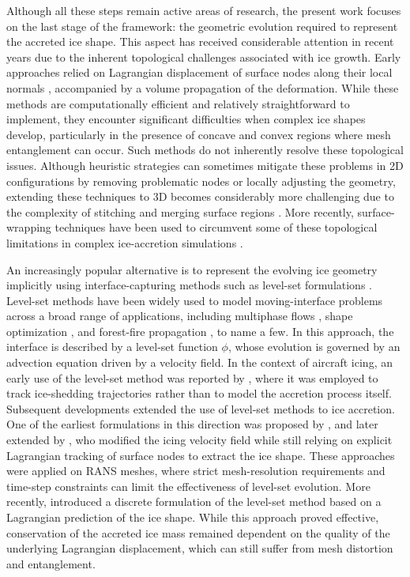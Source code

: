 Although all these steps remain active areas of research, the present work focuses on the last stage of the framework: the geometric evolution required to represent the accreted ice shape. This aspect has received considerable attention in recent years due to the inherent topological challenges associated with ice growth. Early approaches relied on Lagrangian displacement of surface nodes along their local normals \cite{thompsonDeformation}, accompanied by a volume propagation of the deformation. While these methods are computationally efficient and relatively straightforward to implement, they encounter significant difficulties when complex ice shapes develop, particularly in the presence of concave and convex regions where mesh entanglement can occur. Such methods do not inherently resolve these topological issues. Although heuristic strategies can sometimes mitigate these problems in 2D configurations by removing problematic nodes or locally adjusting the geometry, extending these techniques to 3D becomes considerably more challenging due to the complexity of stitching and merging surface regions \cite{glimm2000}.  More recently, surface-wrapping techniques have been used to circumvent some of these topological limitations in complex ice-accretion simulations \cite{Ozcer_2019}.

An increasingly popular alternative is to represent the evolving ice geometry implicitly using interface-capturing methods such as level-set formulations \cite{OSHER2004}. Level-set methods have been widely used to model moving-interface problems across a broad range of applications, including multiphase flows \cite{twoPhaseFlow, multiphaseFlowLS}, shape optimization \cite{ALLAIRE20211}, and forest-fire propagation \cite{MALLET20091089}, to name a few. In this approach, the interface is described by a level-set function $\phi$, whose evolution is governed by an advection equation driven by a velocity field. In the context of aircraft icing, an early use of the level-set method was reported by \cite{HeloiseBeaugendre}, where it was employed to track ice-shedding trajectories rather than to model the accretion process itself. Subsequent developments extended the use of level-set methods to ice accretion. One of the earliest formulations in this direction was proposed by \cite{PENA2016278}, and later extended by \cite{bourgault-coteMultilayerAirfoilIce2019}, who modified the icing velocity field while still relying on explicit Lagrangian tracking of surface nodes to extract the ice shape. These approaches were applied on RANS meshes, where strict mesh-resolution requirements and time-step constraints can limit the effectiveness of level-set evolution. More recently, \cite{alessandroLevelSet} introduced a discrete formulation of the level-set method based on a Lagrangian prediction of the ice shape. While this approach proved effective, conservation of the accreted ice mass remained dependent on the quality of the underlying Lagrangian displacement, which can still suffer from mesh distortion and entanglement.

